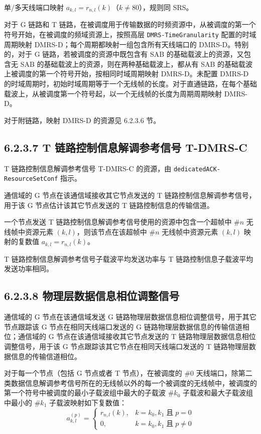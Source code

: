 \documentclass[11pt,a4paper]{ctexart}
\begin{document}
单/多天线端口映射 $a_{k,l} = r_{n,l}(k)$（$k \neq 80$），规则同 SRS。

对于 G 链路和 T 链路，在被调度用于传输数据的时频资源中，从被调度的第一个符号开始，在被调度的频域资源上，按照高层 \texttt{DMRS-TimeGranularity} 配置的时域周期映射 DMRS-D；每个周期都映射一组包含所有天线端口的 DMRS-D。特别的，对于 G 链路，若被调度的资源中既包含有 SAB 的基础载波上的资源，又包含无 SAB 的基础载波上的资源，则在两种基础载波上，都从有 SAB 的基础载波上被调度的第一个符号开始，按相同时域周期映射 DMRS-D。未配置 DMRS-D 的时域周期时，初始时域周期等于一个无线帧的长度。对于直通链路，在每个基础载波上，从被调度第一个符号起，以一个无线帧的长度为周期周期映射 DMRS-D。

对于附链路，映射 DMRS-D 的资源见 6.2.3.6 节。

\subsection{6.2.3.7 T 链路控制信息解调参考信号 T-DMRS-C}

T 链路控制信息解调参考信号 T-DMRS-C 的资源，由 \texttt{dedicatedACK-ResourceSetConf} 指示。

通信域的 G 节点在该通信域接收其它节点发送的 T 链路控制信息解调参考信号，用于该 G 节点估计该其它节点发送的 T 链路控制信息的传输信道。

一个节点发送 T 链路控制信息解调参考信号使用的资源中包含一个超帧中 \#$n$ 无线帧中资源元素 $(k,l)$，则该节点在该超帧中 \#$n$ 无线帧中资源元素 $(k,l)$ 映射的复数值 $a_{k,l} = r_{n,l}(k)$。

T 链路控制信息解调参考信号子载波平均发送功率与 T 链路控制信息子载波平均发送功率相同。

\subsection{6.2.3.8 物理层数据信息相位调整信号}

通信域的 G 节点在该通信域发送 G 链路物理层数据信息相位调整信号，用于其它节点跟踪该 G 节点在相同天线端口发送的 G 链路物理层数据信息的传输信道相位；通信域的 G 节点在该通信域接收其它节点发送的 T 链路物理层数据信息相位调整信号，用于该 G 节点跟踪该其它节点在相同天线端口发送的 T 链路物理层数据信息的传输信道相位。

对于每一个节点（包括 G 节点或者 T 节点），在被调度的 \#0 天线端口，除第二类数据信息解调参考信号所在的无线帧以外的每一个被调度的无线帧中，被调度的第一个符号中被调度的最小子载波组中最大的子载波 \#$k_0$ 子载波和最大子载波组中最小的 \#$k_1$ 子载波映射如下复数值：
\begin{equation}
a_{k,l}^{(p)} =
\begin{cases}
r_{n,l}(k), & k = k_0, k_1 \;\text{且}\; p = 0 \\
0, & k = k_0, k_1 \;\text{且}\; p \neq 0
\end{cases}
\end{equation}
\end{document}
